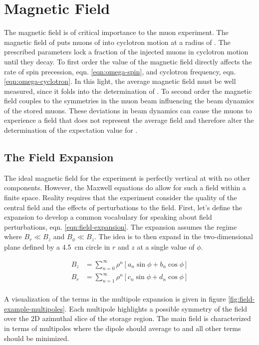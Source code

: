 \section{Magnetic Field}

The magnetic field is of critical importance to the muon \gmtwo experiment.  The magnetic field of \bmagic puts muons of \pmagic into cyclotron motion at a radius of \rmagic.  The prescribed parameters lock a fraction of the injected muons in cyclotron motion until they decay.  To first order the value of the magnetic field directly affects the rate of spin precession, eqn. \ref{eqn:omega-spin}, and cyclotron frequency, eqn. \ref{eqn:omega-cyclotron}.  In this light, the average magnetic field must be well measured, since it folds into the determination of \wa.  To second order the magnetic field couples to the symmetries in the muon beam influencing the beam dynamics of the stored muons.  These deviations in beam dynamics can cause the muons to experience a field that does not represent the average field and therefore alter the determination of the expectation value for \wa.

\subsection{The Field Expansion}

The ideal magnetic field for the experiment is perfectly vertical at \bmagic with no other components.  However, the Maxwell equations do allow for such a field within a finite space.  Reality requires that the experiment consider the quality of the central field and the effects of perturbations to the field.  First, let's define the expansion to develop a common vocabulary for speaking about field perturbations, eqn. \ref{eqn:field-expansion}.  The expansion assumes the regime where $B_r \ll B_z$ and $B_\phi \ll B_z$.  The idea is to then expand in the two-dimensional plane defined by a \SI{4.5}{\cm} circle in $r$ and $z$ at a single value of $\phi$.

\begin{align}
\label{eqn:field-expansion}
B_z & = \sum_{n=0}^{\infty} \rho^n[a_n \sin{\phi} + b_n \cos{\phi}] \\
B_r & = \sum_{n=1}^{\infty} \rho^n[c_n \sin{\phi} + d_n \cos{\phi}] \\
\end{align}

\noindent
A visualization of the terms in the multipole expansion is given in figure \ref{fig:field-example-multipoles}.  Each multipole highlights a possible symmetry of the field over the 2D azimuthal slice of the storage region. The main field is characterized in terms of multipoles where the dipole should average to \bmagic and all other terms should be minimized.

